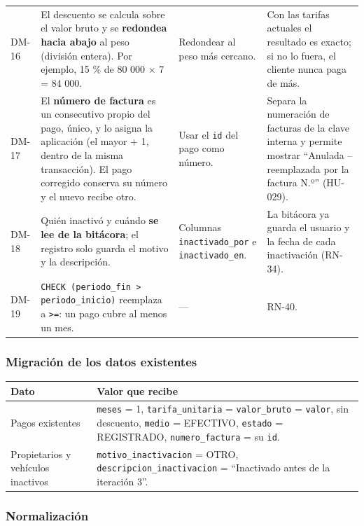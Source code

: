 \begin{longtable}{>{\raggedright\arraybackslash}p{1.5cm}>{\raggedright\arraybackslash}p{3.5cm}>{\raggedright\arraybackslash}p{4.2cm}>{\raggedright\arraybackslash}p{5.2cm}}
DM-16 & El descuento se calcula sobre el valor bruto y se \textbf{redondea hacia abajo} al peso (división entera). Por ejemplo, 15 \% de 80 000 $\times$ 7 = 84 000. & Redondear al peso más cercano. & Con las tarifas actuales el resultado es exacto; si no lo fuera, el cliente nunca paga de más.\\
DM-17 & El \textbf{número de factura} es un consecutivo propio del pago, único, y lo asigna la aplicación (el mayor + 1, dentro de la misma transacción). El pago corregido conserva su número y el nuevo recibe otro. & Usar el \texttt{id} del pago como número. & Separa la numeración de facturas de la clave interna y permite mostrar ``Anulada – reemplazada por la factura N.º'' (HU-029).\\
DM-18 & Quién inactivó y cuándo \textbf{se lee de la bitácora}; el registro solo guarda el motivo y la descripción. & Columnas \texttt{inactivado\_por} e \texttt{inactivado\_en}. & La bitácora ya guarda el usuario y la fecha de cada inactivación (RN-34).\\
DM-19 & \texttt{CHECK (periodo\_fin > periodo\_inicio)} reemplaza a \texttt{>=}: un pago cubre al menos un mes. & --- & RN-40.\\
\bottomrule
\end{longtable}


\subsubsection{Migración de los datos existentes}

\begin{longtable}{>{\raggedright\arraybackslash}p{2.5cm}>{\raggedright\arraybackslash}p{11.9cm}}
\toprule
\textbf{Dato} & \textbf{Valor que recibe}\\
\midrule\endhead
Pagos existentes & \texttt{meses} = 1, \texttt{tarifa\_unitaria} = \texttt{valor\_bruto} = \texttt{valor}, sin descuento, \texttt{medio} = EFECTIVO, \texttt{estado} = REGISTRADO, \texttt{numero\_factura} = su \texttt{id}.\\
Propietarios y vehículos inactivos & \texttt{motivo\_inactivacion} = OTRO, \texttt{descripcion\_inactivacion} = ``Inactivado antes de la iteración 3''.\\
\bottomrule
\end{longtable}


\subsubsection{Normalización}

